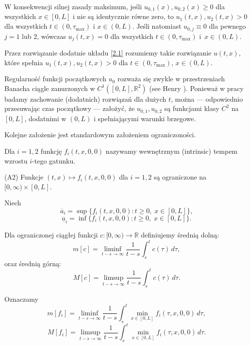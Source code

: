 	W konsekwencji silnej zasady maksimum, jeśli $u_{0,1}(x),u_{0,2}(x)\ge 0$ dla wszystkich $x\in [0,L]$ i nie są identycznie równe zero, to  
	$u_1(t,x),u_2(t,x)>0$ dla wszystkich $t\in (0,\tau_{\max})$ i $x\in (0,L)$.  
	Jeśli natomiast $u_{0,j}\equiv 0$ dla pewnego $j=1$ lub $2$, wówczas $u_j(t,x)=0$ dla wszystkich $t\in (0,\tau_{\max})$ i~$x\in (0,L)$.
	
	Przez rozwiązanie dodatnie układu \eqref{2.1} rozumiemy takie rozwiązanie $u(t,x)$, które spełnia $u_1(t,x),u_2(t,x)>0$ dla $t\in (0,\tau_{\max})$, $x\in (0,L)$.
	
	Regularność funkcji początkowych $u_0$ rozważa się zwykle w przestrzeniach Banacha ciągle zanurzonych w $C^1([0,L],\mathbb{R}^2)$  
	(see Henry \cite{Henry}). Ponieważ w pracy badamy zachowanie (dodatnich) rozwiązań dla dużych $t$, można — odpowiednio przesuwając czas początkowy —  
	założyć, że $u_{0,1},u_{0,2}$ są funkcjami klasy $C^2$ na $[0,L]$, dodatnimi w $(0,L)$ i spełniającymi warunki brzegowe.
	
	\vspace{5mm}
	
	Kolejne założenie jest standardowym założeniem ograniczoności.
	
	Dla $i=1,2$ funkcję $f_i(t,x,0,0)$ nazywamy wewnętrznym (intrinsic) tempem wzrostu $i$-tego gatunku.
	
	(A2) Funkcje $(t,x)\mapsto f_i(t,x,0,0)$ dla $i=1,2$ są ograniczone na $[0,\infty)\times [0,L]$.
	
	Niech
	\begin{equation}
	\overline{a}_i=\sup\{f_i(t,x,0,0): t\ge 0,\; x\in[0,L]\},
    \end{equation}
    \begin{equation}
	\underline{a}_i=\inf\{f_i(t,x,0,0): t\ge 0,\; x\in[0,L]\}.
	\end{equation}
	
	Dla ograniczonej ciągłej funkcji $c:[0,\infty)\to \mathbb{R}$ definiujemy średnią dolną:
	\begin{equation}
	m[c]=\liminf_{t-s\to \infty} \frac{1}{t-s}\int_{s}^{t} c(\tau)\,d\tau,
	\end{equation}
	oraz średnią górną:
	\begin{equation}
	M[c]=\limsup_{t-s\to \infty} \frac{1}{t-s}\int_{s}^{t} c(\tau)\,d\tau.
	\end{equation}
	
	Oznaczamy
	\begin{equation}
	m[f_i]=\liminf_{t-s\to \infty} \frac{1}{t-s}\int_{s}^{t} \min_{x\in[0,L]} f_i(\tau,x,0,0)\,d\tau,
	\end{equation}
	\begin{equation}
	M[f_i]=\limsup_{t-s\to \infty} \frac{1}{t-s}\int_{s}^{t} \min_{x\in[0,L]} f_i(\tau,x,0,0)\,d\tau.
	\end{equation}
	
